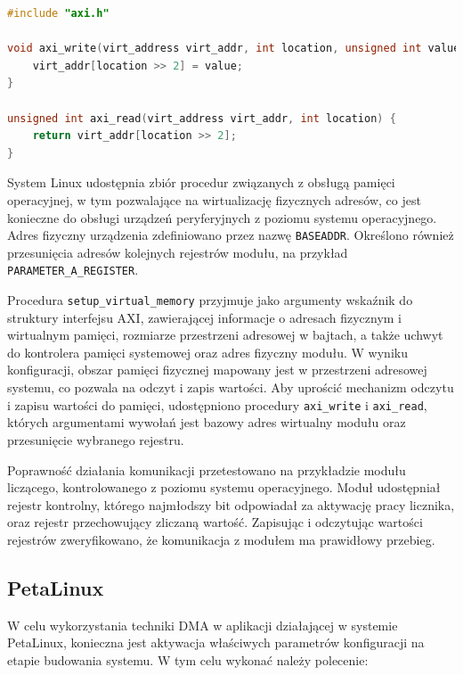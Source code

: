 \begin{lstlisting}[breaklines, language=C, label=lis:axi-dma-petalinux-axi-c, caption=Obsługa modułu w trybie systemowym - \texttt{axi.c}.]
#include "axi.h"

void axi_write(virt_address virt_addr, int location, unsigned int value) {
	virt_addr[location >> 2] = value;
}

unsigned int axi_read(virt_address virt_addr, int location) {
	return virt_addr[location >> 2];
}
\end{lstlisting}

System Linux udostępnia zbiór procedur związanych z obsługą pamięci operacyjnej, w tym pozwalające na wirtualizację fizycznych adresów, co jest konieczne do obsługi urządzeń peryferyjnych z poziomu systemu operacyjnego.
Adres fizyczny urządzenia zdefiniowano przez nazwę \texttt{BASEADDR}. Określono również przesunięcia adresów kolejnych rejestrów modułu, na przykład \texttt{PARAMETER\_A\_REGISTER}.

Procedura \texttt{setup\_virtual\_memory} przyjmuje jako argumenty wskaźnik do struktury interfejsu AXI, zawierającej informacje o adresach fizycznym i wirtualnym pamięci, rozmiarze przestrzeni adresowej w bajtach, a także uchwyt do kontrolera pamięci systemowej oraz adres fizyczny modułu. W wyniku konfiguracji, obszar pamięci fizycznej mapowany jest w przestrzeni adresowej systemu, co pozwala na odczyt i zapis wartości.
Aby uprościć mechanizm odczytu i zapisu wartości do pamięci, udostępniono procedury \texttt{axi\_write} i \texttt{axi\_read}, których argumentami wywołań jest bazowy adres wirtualny modułu oraz przesunięcie wybranego rejestru.

Poprawność działania komunikacji przetestowano na przykładzie modułu liczącego, kontrolowanego z poziomu systemu operacyjnego. Moduł udostępniał rejestr kontrolny, którego najmłodszy bit odpowiadał za aktywację pracy licznika, oraz rejestr przechowujący zliczaną wartość. Zapisując i odczytując wartości rejestrów zweryfikowano, że komunikacja z modułem ma prawidłowy przebieg.

\subsection{PetaLinux}
\label{sec:vivado-axi-dma-petalinux}

W celu wykorzystania techniki DMA w aplikacji działającej w systemie PetaLinux, konieczna jest aktywacja właściwych parametrów konfiguracji na etapie budowania systemu. 
W tym celu wykonać należy polecenie:

